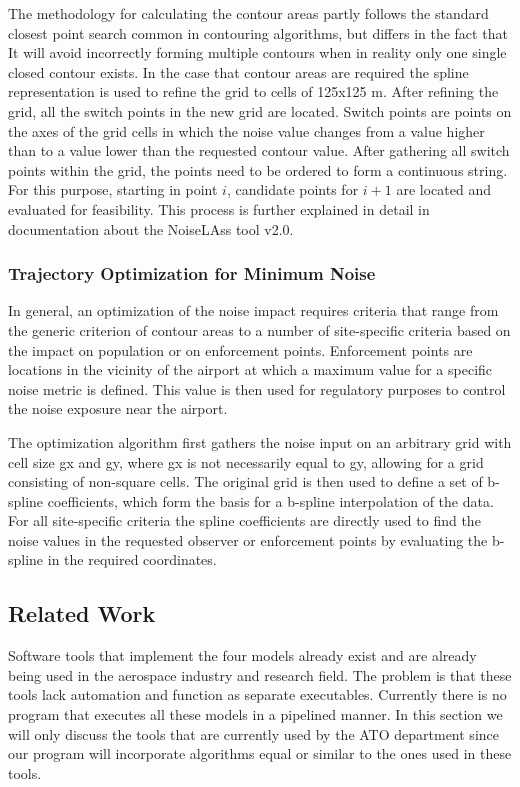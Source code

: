 The methodology for calculating the contour areas partly follows the standard closest point search common in contouring algorithms, but differs in the fact that It will avoid incorrectly forming multiple contours when in reality only one single closed contour exists. In the case that contour areas are required the spline representation is used to refine the grid to cells of 125x125 m. After refining the grid, all the switch points in the new grid are located. Switch points are points on the axes of the grid cells in which the noise value changes from a value higher than to a value lower than the requested contour value. After gathering all switch points within the grid, the points need to be ordered to form a continuous string. For this purpose, starting in point $i$, candidate points for $i+1$ are located and evaluated for feasibility. This process is further explained in detail in documentation about the NoiseLAss tool v2.0. 

\subsubsection{Trajectory Optimization for Minimum Noise}

In general, an optimization of the noise impact requires criteria that range from the generic criterion of contour areas to a number of site-specific criteria based on the impact on population or on enforcement points. Enforcement points are locations in the vicinity of the airport at which a maximum value for a specific noise metric is defined. This value is then used for regulatory purposes to control the noise exposure near the airport. 

The optimization algorithm first gathers the noise input on an arbitrary grid with cell size gx and gy, where gx is not necessarily equal to gy, allowing for a grid consisting of non-square cells. The original grid is then used to define a set of b-spline coefficients, which form the basis for a b-spline interpolation of the data. For all site-specific criteria the spline coefficients are directly used to find the noise values in the requested observer or enforcement points by evaluating the b-spline in the required coordinates.

\subsection{Related Work}
Software tools that implement the four models already exist and are already being used in the aerospace industry and research field. The problem is that these tools lack automation and function as separate executables. Currently there is no program that executes all these models in a pipelined manner. In this section we will only discuss the tools that are currently used by the ATO department since our program will incorporate algorithms equal or similar to the ones used in these tools.

